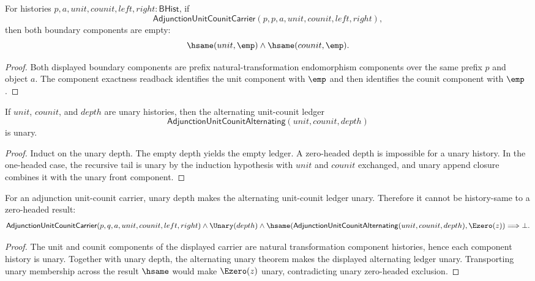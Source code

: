 \begin{theorem}
\label{thm:adjunction-unit-counit-carrier-endomorphism-unit-counit-empty}
For histories $p,a,unit,counit,left,right:\mathsf{BHist}$, if
$$
\mathsf{AdjunctionUnitCounitCarrier}(p,p,a,unit,counit,left,right),
$$
then both boundary components are empty:
$$
\hsame(unit,\emp)\land\hsame(counit,\emp).
$$
\end{theorem}
\begin{proof}
Both displayed boundary components are prefix natural-transformation
endomorphism components over the same prefix $p$ and object $a$. The component
exactness readback identifies the unit component with $\emp$ and then identifies
the counit component with $\emp$.
\end{proof}

\begin{theorem}
\label{thm:adjunction-unit-counit-alternating-unary}
If $unit$, $counit$, and $depth$ are unary histories, then the alternating
unit-counit ledger
$$
\mathsf{AdjunctionUnitCounitAlternating}(unit,counit,depth)
$$
is unary.
\end{theorem}
\begin{proof}
Induct on the unary depth. The empty depth yields the empty ledger. A
zero-headed depth is impossible for a unary history. In the one-headed case,
the recursive tail is unary by the induction hypothesis with $unit$ and
$counit$ exchanged, and unary append closure combines it with the unary
front component.
\end{proof}

\begin{theorem}
\label{thm:adjunction-unit-counit-carrier-alternating-zero-headed-result-absurd}
For an adjunction unit-counit carrier, unary depth makes the alternating
unit-counit ledger unary. Therefore it cannot be history-same to a zero-headed
result:
$$
\mathsf{AdjunctionUnitCounitCarrier}(p,q,a,unit,counit,left,right)
\land \Unary(depth)
\land \hsame(\mathsf{AdjunctionUnitCounitAlternating}(unit,counit,depth),\Ezero(z))
\Longrightarrow \bot.
$$
\end{theorem}
\begin{proof}
The unit and counit components of the displayed carrier are natural
transformation component histories, hence each component history is unary.
Together with unary depth, the alternating unary theorem makes the displayed
alternating ledger unary. Transporting unary membership across the result
\(\hsame\) would make \(\Ezero(z)\) unary, contradicting unary zero-headed
exclusion.
\end{proof}

